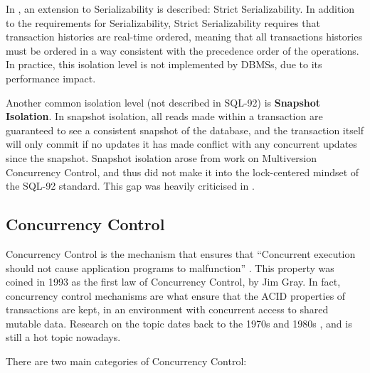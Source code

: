 In \cite{papadimitriou1979serializability}, an extension to
Serializability is described: Strict Serializability. In addition to
the requirements for Serializability, Strict Serializability requires
that transaction histories are real-time ordered, meaning that all
transactions histories must be ordered in a way consistent with the
precedence order of the operations. In practice, this isolation level
is not implemented by DBMSs, due to its performance impact.

Another common isolation level (not described in SQL-92) is {\bf
  Snapshot Isolation}. In snapshot isolation, all reads made within a
transaction are guaranteed to see a consistent snapshot of the
database, and the transaction itself will only commit if no updates it
has made conflict with any concurrent updates since the
snapshot. Snapshot isolation arose from work on Multiversion
Concurrency Control, and thus did not make it into the lock-centered
mindset of the SQL-92 standard. This gap was heavily criticised in
\cite{berenson1995critique}.

\subsection{Concurrency Control}

Concurrency Control is the mechanism that ensures that ``Concurrent
execution should not cause application programs to malfunction''
\cite{reuter1993transaction}. This property was coined in 1993 as the
first law of Concurrency Control, by Jim Gray. In fact, concurrency
control mechanisms are what ensure that the ACID properties of
transactions are kept, in an environment with concurrent access to
shared mutable data. Research on the topic dates back to the 1970s
\cite{rosenkrantz1978system} and 1980s \cite{gray1981transaction}, and
is still a hot topic nowadays.

There are two main categories of Concurrency Control:

